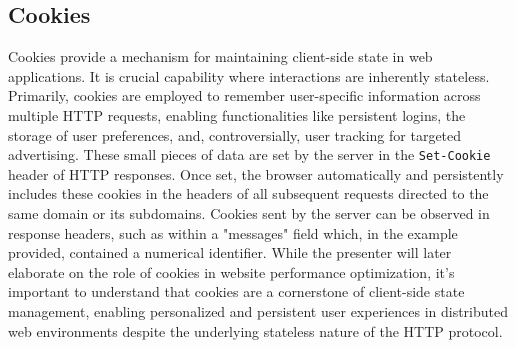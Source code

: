 \subsection{Cookies}
Cookies provide a mechanism for maintaining client-side state in web applications. It is crucial capability where interactions are inherently stateless. Primarily, cookies are employed to remember user-specific information across multiple HTTP requests, enabling functionalities like persistent logins, the storage of user preferences, and, controversially, user tracking for targeted advertising. These small pieces of data are set by the server in the \texttt{Set-Cookie} header of HTTP responses. Once set, the browser automatically and persistently includes these cookies in the headers of all subsequent requests directed to the same domain or its subdomains. Cookies sent by the server can be observed in response headers, such as within a "messages" field which, in the example provided, contained a numerical identifier.  While the presenter will later elaborate on the role of cookies in website performance optimization, it's important to understand that cookies are a cornerstone of client-side state management, enabling personalized and persistent user experiences in distributed web environments despite the underlying stateless nature of the HTTP protocol. \\\\


